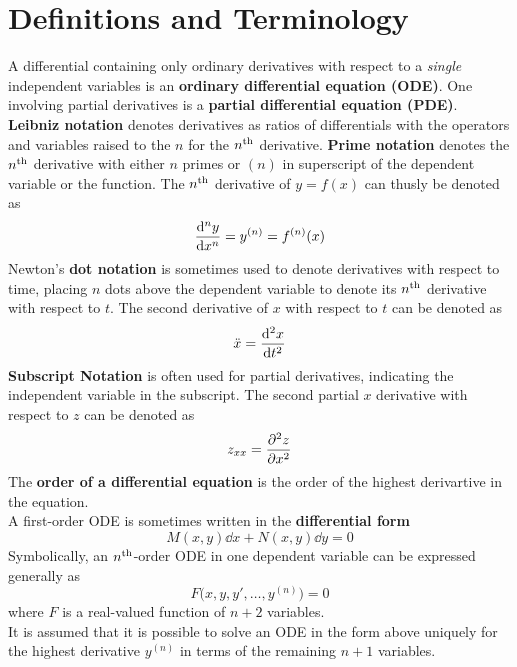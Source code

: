 \documentclass[../Differential Equations.tex]{subfiles}
\begin{document}
	\section{Definitions and Terminology}
			A differential containing only ordinary derivatives with respect to a \textit{single} independent variables is an \textbf{ordinary differential equation (ODE)}. One involving partial derivatives is a \textbf{partial differential equation (PDE)}.
			\textbf{Leibniz notation} denotes derivatives as ratios of differentials with the operators and variables raised to the \(n\) for the \(n^{\text{th}}\) derivative.
			\textbf{Prime notation} denotes the \(n^{\text{th}}\) derivative with either \(n\) primes or \((n)\) in superscript of the dependent variable or the function. The \(n^{\text{th}}\) derivative of $y = f(x)$ can thusly be denoted as
				\[\dv[n]{y}{x} = y^{(n)} = f^{(n)}(x)\]
			Newton's \textbf{dot notation} is sometimes used to denote derivatives with respect to time, placing \(n\) dots above the dependent variable to denote its \(n^{\text{th}}\) derivative with respect to \(t\). The second derivative of \(x\) with respect to \(t\) can be denoted as
				\[\ddot{x} = \dv[2]{x}{t}\]
			\textbf{Subscript Notation} is often used for partial derivatives, indicating the independent variable in the subscript. The second partial \(x\) derivative with respect to \(z\) can be denoted as
				\[z_{xx} = \pdv[2]{z}{x}\]
			The \textbf{order of a differential equation} is the order of the highest derivartive in the equation. \\
			A first-order ODE is sometimes written in the \textbf{differential form}
				\[M(x, y)\dd{x} + N(x, y)\dd{y} = 0\]
			Symbolically, an \(n^{\text{th}}\)-order ODE in one dependent variable can be expressed generally as
				\[F\bigl(x, y, y', \ldots, y^{(n)}\bigr) = 0\]
				where \(F\) is a real-valued function of \(n + 2\) variables. \\
			It is assumed that it is possible to solve an ODE in the form above uniquely for the highest derivative \(y^(n)\) in terms of the remaining \(n + 1\) variables. \\
\end{document}
